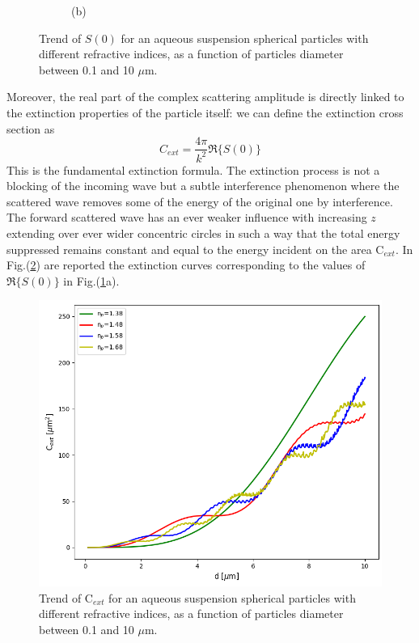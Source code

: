 \documentclass[a4paper, 11pt]{report}
\begin{document}
\begin{figure}[!htb]
\begin{subfigure}{.5\textwidth}
	\caption{(b)}
	\end{subfigure} 
	\caption{Trend of $S\left( 0 \right)$ for an aqueous suspension spherical particles with different refractive indices, as a function of particles diameter between 0.1 and 10 $\mu$m.}
	\label{S0_example}
\end{figure}
\newline
Moreover, the real part of the complex scattering amplitude is directly linked to the extinction properties of the particle itself: we can define the extinction cross section as \cite{BH, VdH}	\begin{equation}
	C_{ext} = \dfrac{4\pi}{k^2}\Re\{ S(0) \}
	\label{cext_sphere}
\end{equation}
This is the fundamental extinction formula. The extinction process is not a blocking of the incoming wave but a subtle interference phenomenon where the scattered wave removes some of the energy of the original one by interference.
The forward scattered wave has an ever weaker influence with increasing $z$ extending over ever wider concentric circles in such a way that the total energy suppressed remains constant and equal to the energy incident on the area C$_{ext}$.
\newpage
In Fig.(\ref{cext_example}) are reported the extinction curves corresponding to the values of $\Re\{S(0)\}$ in Fig.(\ref{S0_example}a).
\begin{figure}[!htb]
	\centering	
	\includegraphics[scale=0.6]{Cext_example.png}
	\caption{Trend of C$_{ext}$ for an aqueous suspension spherical particles with different refractive indices, as a function of particles diameter between 0.1 and 10 $\mu$m.}
	\label{cext_example}
\end{figure}
\end{document}
